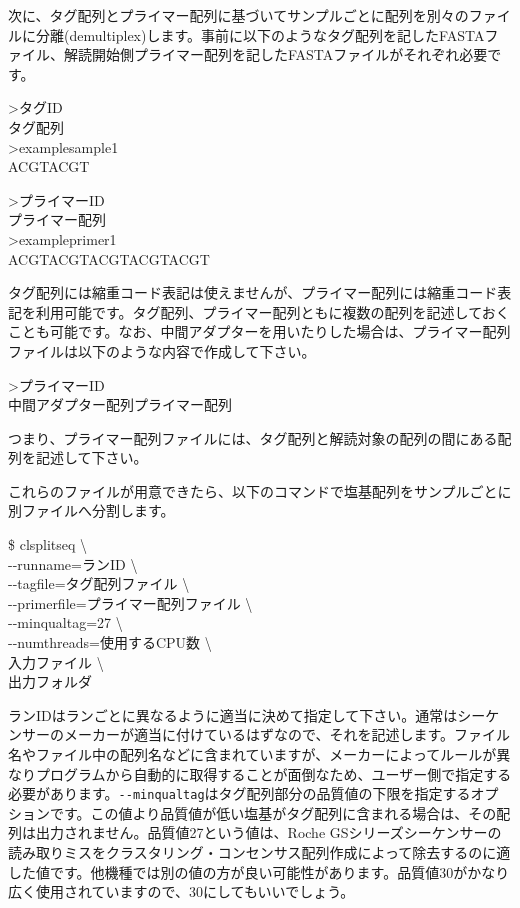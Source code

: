 \documentclass[titlepage,10pt,a4paper,english]{jsbook}
\newenvironment{pre}{\begin{leftbar}\raggedright\ttfamily\footnotesize\setlength{\baselineskip}{1.4em}}{\end{leftbar}\vspace{-1em}}
\newenvironment{cmd}{\begin{oframed}\raggedright\ttfamily\footnotesize\setlength{\baselineskip}{1.4em}}{\end{oframed}\vspace{-1em}}
\begin{document}
次に、タグ配列とプライマー配列に基づいてサンプルごとに配列を別々のファイルに分離(demultiplex)します。事前に以下のようなタグ配列を記したFASTAファイル、解読開始側プライマー配列を記したFASTAファイルがそれぞれ必要です。
\begin{pre}
{\textgreater}タグID\\
タグ配列\\
{\textgreater}examplesample1\\
ACGTACGT
\end{pre}
\begin{pre}
{\textgreater}プライマーID\\
プライマー配列\\
{\textgreater}exampleprimer1\\
ACGTACGTACGTACGTACGT
\end{pre}
タグ配列には縮重コード表記は使えませんが、プライマー配列には縮重コード表記を利用可能です。タグ配列、プライマー配列ともに複数の配列を記述しておくことも可能です。なお、中間アダプターを用いたりした場合は、プライマー配列ファイルは以下のような内容で作成して下さい。
\begin{pre}
{\textgreater}プライマーID\\
中間アダプター配列プライマー配列
\end{pre}
つまり、プライマー配列ファイルには、タグ配列と解読対象の配列の間にある配列を記述して下さい。

これらのファイルが用意できたら、以下のコマンドで塩基配列をサンプルごとに別ファイルへ分割します。
\begin{cmd}
\$ clsplitseq {\textbackslash}\\
{-}{-}runname=ランID {\textbackslash}\\
{-}{-}tagfile=タグ配列ファイル {\textbackslash}\\
{-}{-}primerfile=プライマー配列ファイル {\textbackslash}\\
{-}{-}minqualtag=27 {\textbackslash}\\
{-}{-}numthreads=使用するCPU数 {\textbackslash}\\
入力ファイル {\textbackslash}\\
出力フォルダ
\end{cmd}
ランIDはランごとに異なるように適当に決めて指定して下さい。通常はシーケンサーのメーカーが適当に付けているはずなので、それを記述します。ファイル名やファイル中の配列名などに含まれていますが、メーカーによってルールが異なりプログラムから自動的に取得することが面倒なため、ユーザー側で指定する必要があります。\texttt{{-}{-}minqualtag}はタグ配列部分の品質値の下限を指定するオプションです。この値より品質値が低い塩基がタグ配列に含まれる場合は、その配列は出力されません。品質値27という値は、Roche GSシリーズシーケンサーの読み取りミスをクラスタリング・コンセンサス配列作成によって除去するのに適した値です\citep{Kunin2010}。他機種では別の値の方が良い可能性があります。品質値30がかなり広く使用されていますので、30にしてもいいでしょう。
\end{document}

